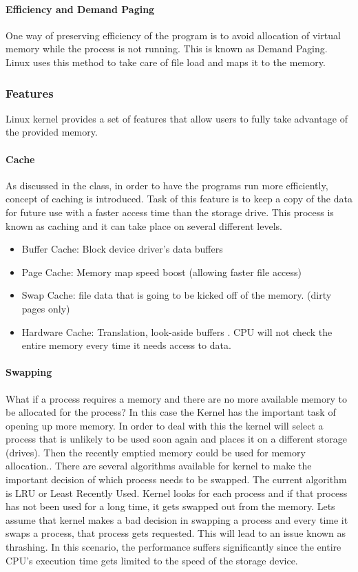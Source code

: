 \documentclass[journal,10pt,onecolumn,compsoc,letterpaper,draftclsnofoot,table,xcdraw]{IEEEtran} \usepackage[margin=0.75in]{geometry}
\begin{document}
\paragraph{Efficiency and Demand Paging} One way of preserving efficiency of the program is to avoid allocation of virtual memory while the process is not running. This is known as Demand Paging. Linux uses this method to take care of file load and maps it to the memory.\cite{2-1}
\subsubsection{Features}
\noindent Linux kernel provides a set of features that allow users to fully take advantage of the provided memory.
\paragraph{Cache} As discussed in the class, in order to have the programs run more efficiently, concept of caching is introduced. Task of this feature is to keep a copy of the data for future use with a faster access time than the storage drive. This process is known as caching and it can take place on several different levels.
\begin{itemize}
\item Buffer Cache: Block device driver's data buffers \label{BC}
\item Page Cache: Memory map speed boost (allowing faster file access)
\item Swap Cache: file data that is going to be kicked off of the memory. (dirty pages only)
\item Hardware Cache: Translation, look-aside buffers \cite{2-1}. CPU will not check the entire memory every time it needs access to data.\label{HWC}
\end{itemize}
\paragraph{Swapping} What if a process requires a memory and there are no more available memory to be allocated for the process? In this case the Kernel has the important task of opening up more memory. In order to deal with this the kernel will select a process that is unlikely to be used soon again and places it on a different storage (drives). Then the recently emptied memory could be used for memory allocation.\cite{2-1}. There are several algorithms available for kernel to make the important decision of which process needs to be swapped. The current algorithm is LRU or Least Recently Used. Kernel looks for each process and if that process has not been used for a long time, it gets swapped out from the memory.
\noindent Lets assume that kernel makes a bad decision in swapping a process and every time it swaps a process, that process gets requested. This will lead to an issue known as thrashing. In this scenario, the performance suffers significantly since the entire CPU's execution time gets limited to the speed of the storage device.
\end{document}
